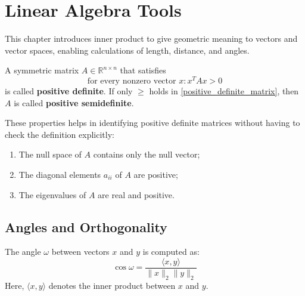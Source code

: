 \documentclass{article}
\begin{document}
\section{Linear Algebra Tools}
This chapter introduces inner product to give geometric meaning to vectors and
vector spaces, enabling calculations of length, distance, and angles.

\begin{definition} 
    A symmetric matrix $A\in \mathbb{R}^{n\times n}$ that satisfies
    \begin{equation}\label{positive_definite_matrix}
        \text{for every nonzero vector }x:x^TAx>0
    \end{equation}    
    is called \textbf{positive definite}. If only $\geq$ holds in
    \ref{positive_definite_matrix}, then $A$ is called \textbf{positive
    semidefinite}.
\end{definition}
These properties helps in identifying positive definite matrices without
having to check the definition explicitly:
\begin{enumerate}
    \item The null space of $A$ contains only the null vector; 
    \item The diagonal elements $a_{ii}$ of $A$ are positive; 
    \item The eigenvalues of $A$ are real and positive.
\end{enumerate}
\subsection{Angles and Orthogonality}
The angle $\omega$ between vectors $x$ and $y$ is computed as:
$$\cos\omega=\frac{\langle x,y\rangle}{\lVert x\rVert_2 \lVert y\rVert_2}$$ 
Here, $\langle x,y\rangle$ denotes the inner product between $x$ and $y$.
\end{document}
